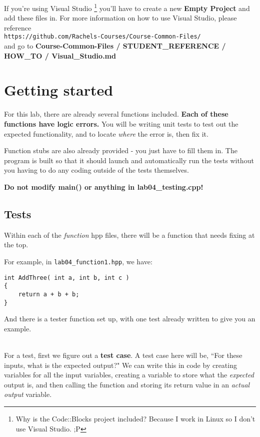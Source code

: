 \documentclass[a4paper,12pt]{book}
\begin{document}
If you're using Visual Studio
\footnote{Why is the Code::Blocks project included? Because I work in Linux so I don't use Visual Studio. ;P}
you'll have to create a new \textbf{Empty Project}
and add these files in. For more information on how to use Visual Studio,
please reference \\
\texttt{https://github.com/Rachels-Courses/Course-Common-Files/} \\
and go to 
\textbf{Course-Common-Files / STUDENT\_REFERENCE / HOW\_TO / Visual\_Studio.md}

    \section*{Getting started}

    For this lab, there are already several functions included.
    \textbf{Each of these functions have logic errors.} You will be
    writing unit tests to test out the expected functionality, and
    to locate \textit{where} the error is, then fix it.

    Function stubs are also already provided - you just have to fill them in.
    The program is built so that it should launch and automatically run the
    tests without you having to do any coding outside of the tests themselves.

    \textbf{Do not modify main() or anything in lab04\_testing.cpp!}

    \subsection*{Tests}

    Within each of the \textit{function} hpp files, there will be a function
    that needs fixing at the top.

    For example, in \texttt{lab04\_function1.hpp}, we have:
    
\begin{lstlisting}[style=code]
int AddThree( int a, int b, int c )
{
    return a + b + b;
}
\end{lstlisting}

    And there is a tester function set up, with one test already written to
    give you an example.
    
    ~\\
    For a test, first we figure out a \textbf{test case}. A test case
    here will be, ``For these inputs, what is the expected output?"
    We can write this in code by creating variables for all the input
    variables, creating a variable to store what the \textit{expected}
    output is, and then calling the function and storing its return
    value in an \textit{actual output} variable.
\end{document}
